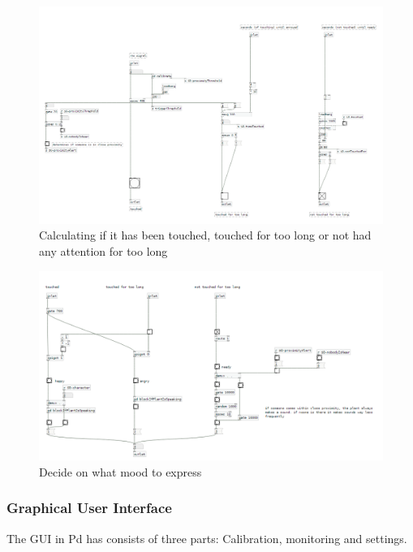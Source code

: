\begin{figure}[H]
\begin{center}
\includegraphics[width=0.9\linewidth]{Figures/calculateTouches.png}
\caption{Calculating if it has been touched, touched for too long or not had any attention for too long}
\end{center}
\end{figure}

\begin{figure}[H]
\begin{center}
\includegraphics[width=0.9\linewidth]{Figures/decideMood.png}
\caption{Decide on what mood to express}
\end{center}
\end{figure}
\subsubsection{Graphical User Interface}
The GUI in Pd has consists of three parts: Calibration, monitoring and settings.


